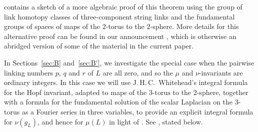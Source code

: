  contains a sketch of a more algebraic proof of this theorem using the group of link homotopy classes of three-component string links and the fundamental groups of spaces of maps of the 2-torus to the $2$-sphere. More details for this alternative proof can be found in our announcement \cite{DGKMSV}, which is otherwise an abridged version of some of the material in the current paper.


In Sections~\ref{sec:B} and~\ref{sec:B'}, we investigate the special case when the pairwise linking numbers $p$, $q$ and $r$ of $L$ are all zero, and so the $\mu$ and $\nu$-invariants are ordinary integers.  In this case we will use J.\,H.\,C.~Whitehead's integral formula for the Hopf invariant, adapted to maps of the $3\text{-torus}$ to the $2$-sphere, together with a formula for the fundamental solution of the scalar Laplacian on the $3$-torus as a Fourier series in three variables, to provide an explicit integral formula for $\nu(g_L)$, and hence for $\mu(L)$ in light of .  See , stated below.
 
